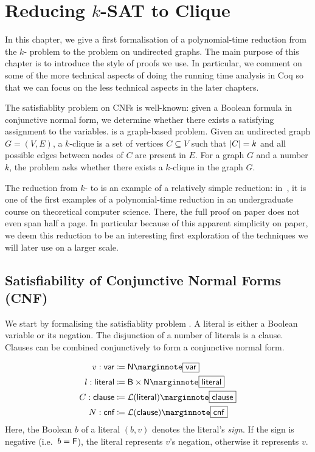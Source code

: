 \newcommand{\varBound}{\textsf{varBound}}
\newcommand{\maxVar}{\textsf{maxVar}}

\chapter{Reducing $k$-SAT to Clique}\label{chap:ksat_clique}
In this chapter, we give a first formalisation of a polynomial-time reduction from the $k$-\SAT{} problem to the \Clique{} problem on undirected graphs. The main purpose of this chapter is to introduce the style of proofs we use. In particular, we comment on some of the more technical aspects of doing the running time analysis in Coq so that we can focus on the less technical aspects in the later chapters. 

The satisfiablity problem \SAT{} on CNFs is well-known: given a Boolean formula in conjunctive normal form, we determine whether there exists a satisfying assignment to the variables. 
\Clique{} is a graph-based problem. Given an undirected graph $G = (V, E)$, a $k$-clique is a set of vertices $C \subseteq V$ such that $|C| = k$ and all possible edges between nodes of $C$ are present in $E$. For a graph $G$ and a number $k$, the \Clique{} problem asks whether there exists a $k$-clique in the graph $G$. 

The reduction from $k$-\SAT{} to \Clique{} is an example of a relatively simple reduction: in~\cite{Bläser:TISkript}, it is one of the first examples of a polynomial-time reduction in an undergraduate course on theoretical computer science. There, the full proof on paper does not even span half a page. 
In particular because of this apparent simplicity on paper, we deem this reduction to be an interesting first exploration of the techniques we will later use on a larger scale.

\section{Satisfiability of Conjunctive Normal Forms (CNF)}\label{sec:sat}
We start by formalising the satisfiablity problem \SAT{}.
A literal is either a Boolean variable or its negation. The disjunction of a number of literals is a clause. Clauses can be combined conjunctively to form a conjunctive normal form. 

\newcommand*{\bvar}{\textsf{var}}
\newcommand*{\literal}{\textsf{literal}}
\newcommand*{\clause}{\textsf{clause}}
\newcommand*{\cnf}{\textsf{cnf}}
\newcommand*{\assgn}{\textsf{assgn}}
\newcommand*{\eval}{\mathcal{E}}
\newcommand*{\evalA}[2]{\eval~#1~#2}
\begin{align*}
  v : \bvar &\defeq \nat \mnote{\bvar}\\
  l : \literal &\defeq \bool \times \nat \mnote{\literal}\\
  C : \clause &\defeq \listsof{\literal} \mnote{\clause}\\
  N : \cnf &\defeq \listsof{\clause} \mnote{\cnf}
\end{align*}
Here, the Boolean $b$ of a literal $(b, v)$ denotes the literal's \emph{sign}. If the sign is negative (i.e.\ $b = \mathsf{F}$), the literal represents $v$'s negation, otherwise it represents $v$.

